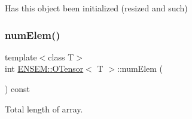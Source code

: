 Has this object been initialized (resized and such) 

\mbox{\label{classENSEM_1_1OTensor_a30a241a5b4f16fab55fd70ffee52828a}} 
\subsubsection{\texorpdfstring{numElem()}{numElem()}\hspace{0.1cm}{\footnotesize\ttfamily [1/2]}}
{\footnotesize\ttfamily template$<$class T$>$ \\
int \mbox{\hyperlink{classENSEM_1_1OTensor}{E\+N\+S\+E\+M\+::\+O\+Tensor}}$<$ T $>$\+::num\+Elem (\begin{DoxyParamCaption}{ }\end{DoxyParamCaption}) const\hspace{0.3cm}{\ttfamily [inline]}}



Total length of array. 

